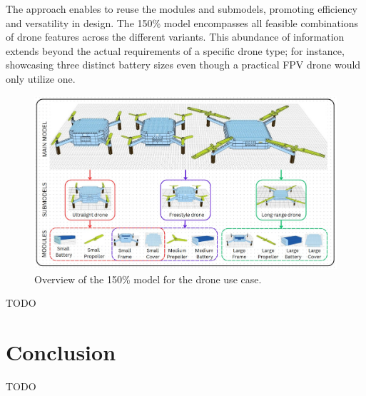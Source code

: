 \documentclass[sigconf,review]{acmart}
\begin{document}
The approach enables to reuse the modules and submodels, promoting efficiency and versatility in design. 
The 150\% model encompasses all feasible combinations of drone features across the different variants. 
This abundance of information extends beyond the actual requirements of a specific drone type; for instance, showcasing three distinct battery sizes even though a practical FPV drone would only utilize one.


\begin{figure}[htbp]
    \includegraphics[width=\textwidth]{./150_MODEL_3.jpg}
    \caption{Overview of the 150\% model for the drone use case.}
    \label{fig:150-model}
\end{figure}

TODO

\section{Conclusion}
\label{sec:conclusion}

TODO



\end{document}
